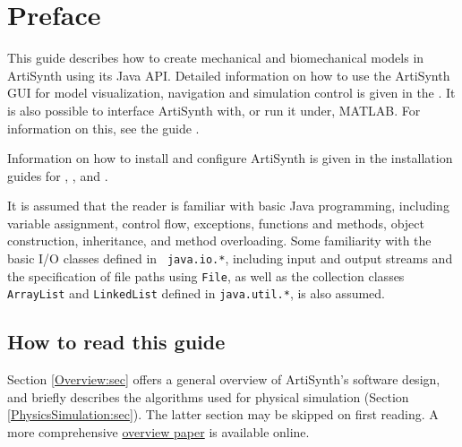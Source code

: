 

\def\maindoc{}%
\def\doctitle{ArtiSynth Modeling Guide}




\chapter*{Preface}

This guide describes how to create mechanical and biomechanical models
in ArtiSynth using its Java API.  Detailed information on how to use
the ArtiSynth GUI for model visualization, navigation and simulation
control is given in the
.
It is also possible to interface ArtiSynth with, or run it under,
MATLAB. For information on this, see the guide
.

Information on how to install and configure ArtiSynth is given in the
installation guides for
, 
,
and 
.

It is assumed that the reader is familiar with basic Java programming,
including variable assignment, control flow, exceptions, functions and
methods, object construction, inheritance, and method overloading.
Some familiarity with the basic I/O classes defined in {\tt
java.io.*}, including input and output streams and the specification
of file paths using {\tt File}, as well as the collection classes
{\tt ArrayList} and {\tt LinkedList} defined in {\tt java.util.*}, is
also assumed.

\section*{How to read this guide}

Section \ref{Overview:sec} offers a general overview of ArtiSynth's
software design, and briefly describes the algorithms used for
physical simulation (Section \ref{PhysicsSimulation:sec}). The latter
section may be skipped on first reading. A more comprehensive
\href{http://www.artisynth.org/doc/artisynth.pdf}{overview paper} is
available online.

